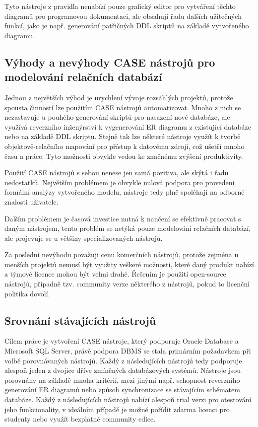 \documentclass[czech,bachelor,public,dept460,male,oneside]{diploma}
\begin{document}
Tyto nástroje z pravidla nenabízí pouze grafický editor pro vytváření těchto diagramů pro programovou dokumentaci, ale obsahují řadu dalších užitečných funkcí, jako je např. generování patřičných DDL skriptů na základě vytvořeného diagramu.

	\subsection{Výhody a nevýhody CASE nástrojů pro modelování relačních databází}
	Jednou z největších výhod je urychlení vývoje rozsáhlých projektů, protože spousta činností lze použitím CASE nástrojů automatizovat. Mnoho z nich se nezastavuje u pouhého generování skriptů pro nasazení nové databáze, ale využívá reverzního inženýrství k vygenerování ER diagramu z existující databáze nebo na základě DDL skriptu. Stejně tak lze některé nástroje využít k tvorbě objektově-relačního mapování pro přístup k datovému zdroji, což ušetří mnoho času a práce. Tyto možnosti obvykle vedou ke značnému zvýšení produktivity.
	
	Použití CASE nástrojů s sebou nenese jen samá pozitiva, ale skýtá i řadu nedostatků. Největším problémem je obvykle nulová podpora pro provedení formální analýzy vytvořeného modelu, nástroje tedy plně spoléhají na odborné znalosti uživatele. 
	
	Dalším problémem je časová investice nutná k naučení se efektivně pracovat s daným nástrojem, tento problém se netýká pouze modelování relačních databází, ale projevuje se u většiny specializovaných nástrojů. 
	
	Za poslední nevýhodu považuji cenu komerčních nástrojů, protože zejména u menších projektů nemusí být využity veškeré možnosti, které daný produkt nabízí a týmové licence mohou být velmi drahé. Řešením je použití open-source nástrojů, případně tzv. community verze některého z nástrojů, pokud to licenční politika dovolí.
	
	\subsection{Srovnání stávajících nástrojů}
	Cílem práce je vytvoření CASE nástroje, který podporuje Oracle Database a Microsoft SQL Server, právě podpora DBMS se stala primárním požadavkem při volbě porovnávaných nástrojů. Každý z následujících nástrojů tedy podporuje alespoň jeden z dvojice dříve zmíněných databázových systémů. Nástroje jsou porovnány na základě mnoha kritérií, mezi jinými např. schopnost reverzního generování ER diagramů nebo způsob synchronizace se stávajícím schématem databáze. Každý z následujících nástrojů nabízí alespoň trial verzi pro otestování jeho funkcionality, v ideálním případě je možné pořídit zdarma licenci pro studenty nebo využít bezplatné community edice. 
	
\end{document}
